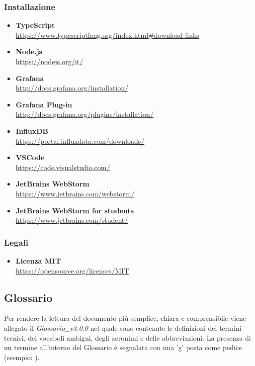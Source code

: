 \subsubsection{Installazione}
\begin{itemize}
	\item{\textbf{TypeScript}\\
		\url{https://www.typescriptlang.org/index.html#download-links}}
	\item{\textbf{Node.js}\\
		\url{https://nodejs.org/it/}}
	\item{\textbf{Grafana}\\
		\url{http://docs.grafana.org/installation/}}
	\item{\textbf{Grafana Plug-in}\\
		\url{http://docs.grafana.org/plugins/installation/}}
	\item{\textbf{InfluxDB}\\
		\url{https://portal.influxdata.com/downloads/}}
	\item{\textbf{VSCode}\\
		\url{https://code.visualstudio.com/}}
	\item{\textbf{JetBrains WebStorm}\\
		\url{https://www.jetbrains.com/webstorm/}}
	\item{\textbf{JetBrains WebStorm for students}\\
		\url{https://www.jetbrains.com/student/}}
\end{itemize}	
\subsubsection{Legali}
\begin{itemize}
	\item{\textbf{Licenza MIT}\\
		\url{https://opensource.org/licenses/MIT}}
\end{itemize}
\subsection{Glossario}
Per rendere la lettura del documento più semplice, chiara e comprensibile viene allegato il
\emph{Glossario\_v3.0.0} nel quale sono contenute le definizioni dei termini tecnici, dei vocaboli
ambigui, degli acronimi e delle abbreviazioni. La presenza di un termine all'interno del
Glossario è segnalata con una 'g' posta come pedice (esempio: ).

\pagebreak